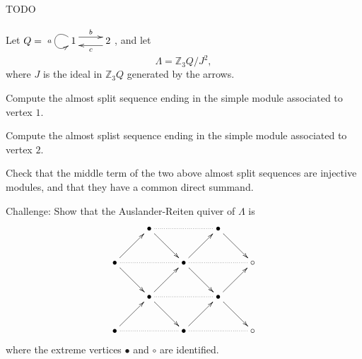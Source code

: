 \documentclass[a4paper]{amsart}
\begin{document}

\begin{Exercise}[title={Projective cover}]
TODO
\end{Exercise}

\begin{Exercise}[title={Almost split sequences}]
Let $Q=\xymatrix{ 1\ar@(ul,dl)_a \ar@<1ex>[r]^b &
  2\ar@<1ex>[l]^c }$, and let 
\[\Lambda = \mathbb{Z}_3Q/J^2,\] 
where $J$ is the ideal in $\mathbb{Z}_3Q$ generated by the
arrows. 

\Question Compute the almost split sequence ending in the simple
module associated to vertex $1$.

\Question Compute the almost splist sequence ending in the simple
module associated to vertex $2$. 

\Question Check that the middle term of the two above almost split
sequences are injective modules, and that they have a common direct
summand. 

\Question Challenge: Show that the Auslander-Reiten quiver of $\Lambda$ is 
\[\xymatrix{
 & \bullet\ar@{..}[rr]\ar[dr] &         & \bullet\ar[dr] & \\
\bullet \ar@{..}[rr]\ar[ur]\ar[dr] & & \bullet \ar@{..}[rr]\ar[ur]\ar[dr] && \circ \\
 & \bullet\ar@{..}[rr]\ar[ur]\ar[dr] &         & \bullet \ar[ur]\ar[dr] & \\
\bullet\ar@{..}[rr]\ar[ur] & & \bullet \ar@{..}[rr]\ar[ur] && \circ 
}\]
where the extreme vertices $\bullet$ and $\circ$ are identified. 
\end{Exercise}
\end{document}
